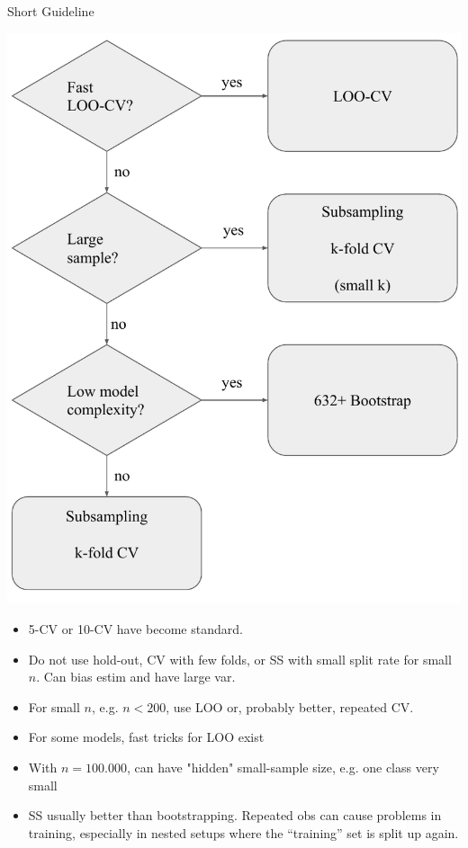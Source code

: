 \documentclass[11pt,compress,t,notes=noshow, xcolor=table]{beamer}
\begin{document}
\begin{vbframe}{Short Guideline}

\fboxsep=0pt
\noindent%
\begin{minipage}[t]{0.42\linewidth}
\vspace{0pt}
\includegraphics{figure_man/resampling_dec_tree}
\end{minipage}%
\hfill%
%
\begin{minipage}[t]{0.58\linewidth}
\vspace{0pt}
\footnotesize
\begin{itemize}
  \item 5-CV or 10-CV have become standard.
  \item Do not use hold-out, CV with few folds, or SS with small 
  split rate for small $n$. Can bias estim and have large var.
  \item For small $n$, e.g. $n < 200$, use 
  LOO or, probably better, repeated CV.
  \item For some models, fast tricks for LOO exist
  \item With $n = 100.000$, can have "hidden" small-sample size, e.g.
  one class very small
  \item SS usually better than bootstrapping. Repeated obs can cause problems in training,
    especially in nested setups where the \enquote{training} set is split up again.
\end{itemize}
\end{minipage}



\end{vbframe}

\endlecture
\end{document}
